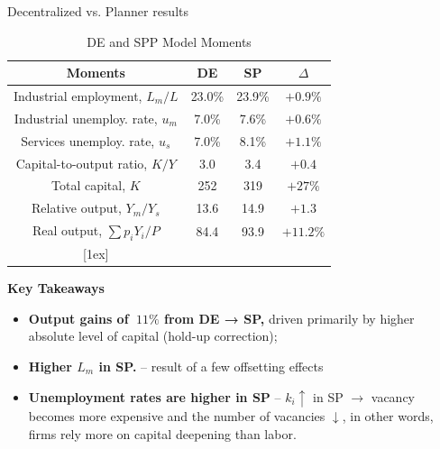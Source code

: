 \documentclass[9pt,xcolor={svgnames}]{beamer}
\begin{document}
\begin{frame}{Decentralized vs. Planner results }

\begin{table}[h!]
\centering
\caption{DE and SPP Model Moments}
 \begin{tabular}{||c c c c||} 
 \hline
 \textbf{Moments} & \textbf{DE} & \textbf{SP}  & $\Delta$ \\  
 \hline\hline
  Industrial employment, $L_m/L$ & 23.0\%  & 23.9\% & $+0.9\%$ \\
  Industrial unemploy. rate, $u_m$ & 7.0\% & 7.6\% & $+0.6\%$  \\ 
   Services unemploy. rate,  $u_s$ & 7.0\% & 8.1\% & $+1.1\% $ \\ 
  Capital-to-output ratio, $K/Y$ & 3.0 & 3.4    &   $+0.4$\\
  Total capital,  $K$  & 252  & 319 & $ + 27\% $\\
 Relative output, $Y_m/Y_s$ & 13.6  & 14.9  & $+1.3$\\
 Real output, $\sum p_iY_i/P$ &  84.4   &  93.9 & $+11.2\%$ \\
 [1ex] 
 \hline
 \end{tabular}
 
\end{table} 


\textbf{Key Takeaways}
\begin{itemize}
  \item  \textbf{Output gains of $~11\%$ from DE → SP,} driven primarily by higher absolute level of capital (hold-up correction); 
\medskip
         \item \textbf{Higher $L_m$ in SP.} -- result of a few offsetting effects

          \item \textbf{Unemployment rates are higher in SP} -- $k_i \uparrow$ in SP $\rightarrow$ vacancy becomes more expensive and the number of vacancies $\downarrow$, in other words,  firms rely more on capital deepening than labor.  
         
\end{itemize}
\end{frame}
\end{document}
